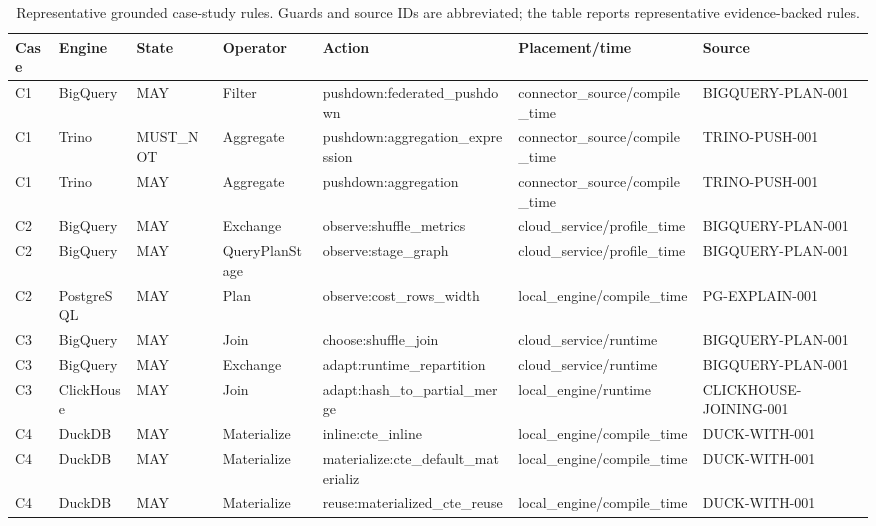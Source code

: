 \begin{table}[t]
\centering
\caption{Representative grounded case-study rules. Guards and source IDs are abbreviated; the table reports representative evidence-backed rules.}
\label{tab:case-study-examples}
\footnotesize
\begin{tabular}{lllllll}
\toprule
Case & Engine & State & Operator & Action & Placement/time & Source \\ 
\midrule
C1 & BigQuery & MAY & Filter & pushdown:federated\_pushdown & connector\_source/compile\_time & BIGQUERY-PLAN-001 \\ 
C1 & Trino & MUST\_NOT & Aggregate & pushdown:aggregation\_expression & connector\_source/compile\_time & TRINO-PUSH-001 \\ 
C1 & Trino & MAY & Aggregate & pushdown:aggregation & connector\_source/compile\_time & TRINO-PUSH-001 \\ 
C2 & BigQuery & MAY & Exchange & observe:shuffle\_metrics & cloud\_service/profile\_time & BIGQUERY-PLAN-001 \\ 
C2 & BigQuery & MAY & QueryPlanStage & observe:stage\_graph & cloud\_service/profile\_time & BIGQUERY-PLAN-001 \\ 
C2 & PostgreSQL & MAY & Plan & observe:cost\_rows\_width & local\_engine/compile\_time & PG-EXPLAIN-001 \\ 
C3 & BigQuery & MAY & Join & choose:shuffle\_join & cloud\_service/runtime & BIGQUERY-PLAN-001 \\ 
C3 & BigQuery & MAY & Exchange & adapt:runtime\_repartition & cloud\_service/runtime & BIGQUERY-PLAN-001 \\ 
C3 & ClickHouse & MAY & Join & adapt:hash\_to\_partial\_merge & local\_engine/runtime & CLICKHOUSE-JOINING-001 \\ 
C4 & DuckDB & MAY & Materialize & inline:cte\_inline & local\_engine/compile\_time & DUCK-WITH-001 \\ 
C4 & DuckDB & MAY & Materialize & materialize:cte\_default\_materializ & local\_engine/compile\_time & DUCK-WITH-001 \\ 
C4 & DuckDB & MAY & Materialize & reuse:materialized\_cte\_reuse & local\_engine/compile\_time & DUCK-WITH-001 \\ 
\bottomrule
\end{tabular}
\end{table}
